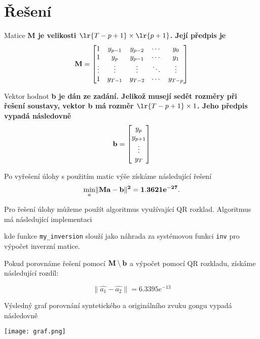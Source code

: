 \section{Řešení}

Matice \bf{M} je velikosti \( \lr{T - p + 1} \times \lr{p + 1} \). Její předpis je
\[
    \bf{M} = 
    \begin{bmatrix}
        1 & y_{p - 1} & y_{p - 2} & \cdots & y_0 \\
        1 & y_p & y_{p - 1} & \cdots & y_1 \\
        \vdots & \vdots & \vdots & \ddots & \vdots \\
        1 & y_{T - 1} & y_{T - 2} & \cdots & y_{T - p}
    \end{bmatrix}
\]

Vektor hodnot \bf{b} je dán ze zadání. Jelikož musejí sedět rozměry při řešení soustavy, vektor \bf{b} má rozměr \( \lr{T - p + 1} \times 1 \). Jeho předpis vypadá následovně
\[
    \bf{b} =
    \begin{bmatrix}
        y_p \\
        y_{p + 1} \\
        \vdots \\
        y_T
    \end{bmatrix}
\]

Po vyřešení úlohy s použitím matic výše získáme následující řešení
\[ \min_a \lVert \bf{M} \bf{a} - \bf{b} \rVert^2 = 1.3621e^{-27}. \]

Pro řešení úlohy můžeme použít algoritmus využívající QR rozklad. Algoritmus má následující implementaci



kde funkce \verb|my_inversion| slouží jako náhrada za systémovou funkci \verb|inv| pro výpočet inverzní matice.

Pokud porovnáme řešení pomocí \( \bf{M} \setminus \bf{b} \) a výpočet pomocí QR rozkladu, získáme následující rozdíl:

\[ \lVert \hat{a_1} - \hat{a_2} \rVert = 6.3395e^{-13} \]

Výsledný graf porovnání syntetického a originálního zvuku gongu vypadá následovně

\begin{center}
    \texttt{[image: graf.png]}
\end{center}

